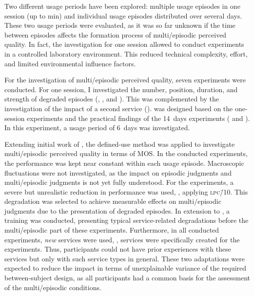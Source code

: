 Two different usage periods have been explored: multiple usage episodes in one session (up to \unit[45]{min}) and individual usage episodes distributed over several days.
These two usage periods were evaluated, as it was so far unknown if the time between episodes affects the formation process of multi\-/episodic perceived quality.
In fact, the investigation for one session allowed to conduct experiments in a controlled laboratory environment.
This reduced technical complexity, effort, and limited environmental influence factors.

For the investigation of multi\-/episodic perceived quality, seven experiments were conducted.
For one session, I investigated the number, position, duration, and strength of degraded episodes (, \EIIa{}, and ).
This was complemented by the investigation of the impact of a second service (\EIIb{}).
 was designed based on the one-session experiments and the practical findings of the 14~days experiments ( and ).
In this experiment, a usage period of 6~days was investigated.

Extending initial work of \citet{moller_single-call_2011}, the defined-use method was applied to investigate multi\-/episodic perceived quality in terms of \ac{MOS}.
In the conducted experiments, the performance was kept near constant within each usage episode.
Macroscopic fluctuations were not investigated, as the impact on episodic judgments and multi\-/episodic judgments is not yet fully understood.
For the experiments, a severe but unrealistic reduction in performance was used, \ie, applying \textsc{\lowercase{LPC\=/10}}.
This degradation was selected to achieve measurable effects on multi\-/episodic judgments due to the presentation of degraded episodes.
In extension to \citet{moller_single-call_2011}, a training was conducted, presenting typical service-related degradations before the multi\-/episodic part of these experiments.
Furthermore, in all conducted experiments, \emph{new} services were used, \ie, services were specifically created for the experiments.
Thus, participants could not have prior experiences with these services but only with such service types in general.
These two adaptations were expected to reduce the impact in terms of unexplainable variance of the required between-subject design, as all participants had a common basis for the assessment of the multi\-/episodic conditions.

